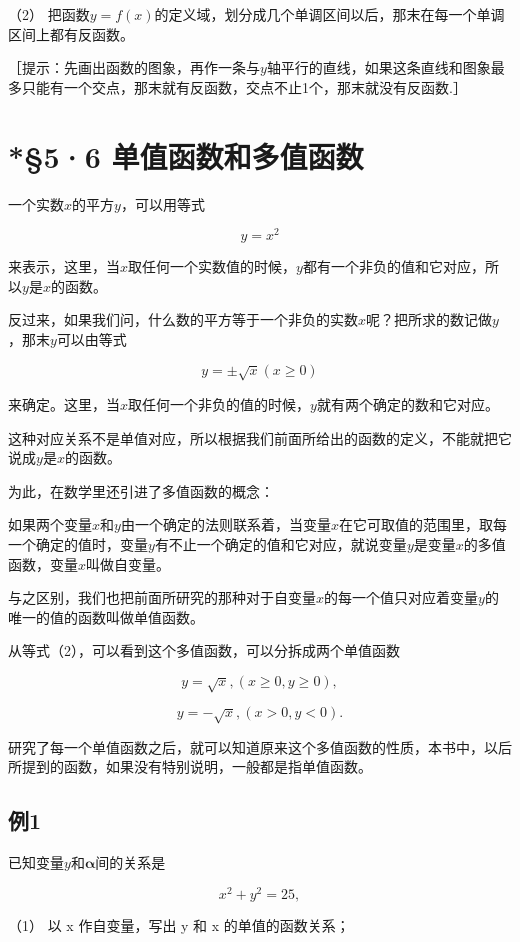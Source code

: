 （2）
把函数\(y = f(x)\)的定义域，划分成几个单调区间以后，那末在每一个单调区间上都有反函数。

［提示：先画出函数的图象，再作一条与\(y\)轴平行的直线，如果这条直线和图象最多只能有一个交点，那末就有反函数，交点不止1个，那末就没有反函数.］

\section{*§5·6 单值函数和多值函数}

一个实数\(x\)的平方\(y\)，可以用等式

\[
y = x^{2} \tag {1}
\]

来表示，这里，当\(x\)取任何一个实数值的时候，\(y\)都有一个非负的值和它对应，所以\(y\)是\(x\)的函数。

反过来，如果我们问，什么数的平方等于一个非负的实数\(x\)呢？把所求的数记做\(y\)，那末\(y\)可以由等式

\[
y = \pm \sqrt{x} (x \geqslant 0) \tag {2}
\]

来确定。这里，当\(x\)取任何一个非负的值的时候，\(y\)就有两个确定的数和它对应。

这种对应关系不是单值对应，所以根据我们前面所给出的函数的定义，不能就把它说成\(y\)是\(x\)的函数。

为此，在数学里还引进了多值函数的概念：

如果两个变量\(x\)和\(y\)由一个确定的法则联系着，当变量\(x\)在它可取值的范围里，取每一个确定的值时，变量\(y\)有不止一个确定的值和它对应，就说变量\(y\)是变量\(x\)的多值函数，变量\(x\)叫做自变量。

与之区别，我们也把前面所研究的那种对于自变量\(x\)的每一个值只对应着变量\(y\)的唯一的值的函数叫做单值函数。

从等式（2），可以看到这个多值函数，可以分拆成两个单值函数

\[
y = \sqrt{x}, (x \geqslant 0, y \geqslant 0),
\]

\[
y = - \sqrt{x}, (x > 0, y < 0).
\]

研究了每一个单值函数之后，就可以知道原来这个多值函数的性质，本书中，以后所提到的函数，如果没有特别说明，一般都是指单值函数。

\subsection{例1}

已知变量\(y\)和\(\pmb{\alpha}\)间的关系是

\[
x^{2} + y^{2} = 25,
\]

（1） 以 x 作自变量，写出 y 和 x 的单值的函数关系；

